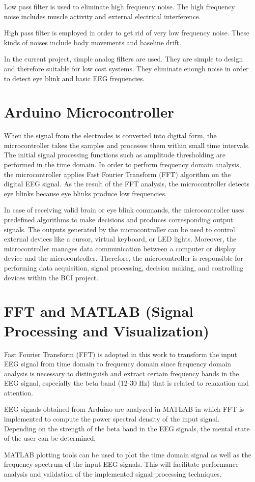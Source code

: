 Low pass filter is used to eliminate high frequency noise. The high frequency noise includes muscle activity and external electrical interference.

High pass filter is employed in order to get rid of very low frequency noise. These kinds of noises include body movements and baseline drift.

In the current project, simple analog filters are used. They are simple to design and therefore suitable for low cost systems. They eliminate enough noise in order to detect eye blink and basic EEG frequencies.

\section{Arduino Microcontroller}
When the signal from the electrodes is converted into digital form, the microcontroller takes the samples and processes them within small time intervals. The initial signal processing functions such as amplitude thresholding are performed in the time domain. In order to perform frequency domain analysis, the microcontroller applies Fast Fourier Transform (FFT) algorithm on the digital EEG signal. As the result of the FFT analysis, the microcontroller detects eye blinks because eye blinks produce low frequencies.

In case of receiving valid brain or eye blink commands, the microcontroller uses predefined algorithms to make decisions and produces corresponding output signals. The outputs generated by the microcontroller can be used to control external devices like a cursor, virtual keyboard, or LED lights. Moreover, the microcontroller manages data communication between a computer or display device and the microcontroller. Therefore, the microcontroller is responsible for performing data acquisition, signal processing, decision making, and controlling devices within the BCI project.

\section{FFT and MATLAB (Signal Processing and Visualization)}
Fast Fourier Transform (FFT) is adopted in this work to transform the input EEG signal from time domain to frequency domain since frequency domain analysis is necessary to distinguish and extract certain frequency bands in the EEG signal, especially the beta band (12-30 Hz) that is related to relaxation and attention.

EEG signals obtained from Arduino are analyzed in MATLAB in which FFT is implemented to compute the power spectral density of the input signal. Depending on the strength of the beta band in the EEG signals, the mental state of the user can be determined.

MATLAB plotting tools can be used to plot the time domain signal as well as the frequency spectrum of the input EEG signals. This will facilitate performance analysis and validation of the implemented signal processing techniques.
